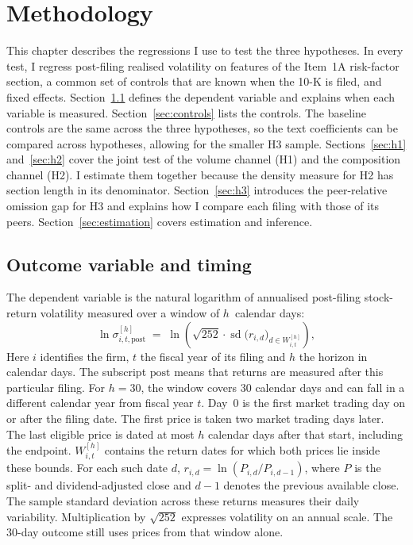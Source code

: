 \chapter{Methodology}
\label{ch:methodology}

This chapter describes the regressions I use to test the three hypotheses.
In every test, I regress post-filing realised volatility on features of the
Item~1A risk-factor section, a common set of controls that are known when the
10-K is filed, and fixed effects.
Section~\ref{sec:outcome} defines the dependent variable and explains when
each variable is measured. Section~\ref{sec:controls} lists the controls. The baseline controls
are the same across the three hypotheses, so the text coefficients can be compared across hypotheses, allowing for the smaller H3 sample. Sections~\ref{sec:h1} and~\ref{sec:h2} cover the joint
test of the volume channel (H1) and the composition channel (H2). I estimate
them together because the density measure for H2 has section length in its
denominator. Section~\ref{sec:h3} introduces the peer-relative omission gap
for H3 and explains how I compare each filing with those of its peers. Section~\ref{sec:estimation}
covers estimation and inference.


\section{Outcome variable and timing}
\label{sec:outcome}

The dependent variable is the natural logarithm of annualised post-filing
stock-return volatility measured over a window of $h$~calendar days:
\begin{equation}
\ln \sigma_{i,t,\mathrm{post}}^{[h]} \;=\; \ln\!\left(
\sqrt{252}\cdot
\operatorname{sd}\!\bigl(r_{i,d}\bigr)_{d \in W_{i,t}^{[h]}}
\right),
\label{eq:vol}
\end{equation}
Here $i$ identifies the firm, $t$ the fiscal year of its filing and $h$ the horizon in calendar days. The subscript $\mathrm{post}$ means that returns are measured after this particular filing. For $h=30$, the window covers 30 calendar days and can fall in a different calendar year from fiscal year $t$. Day~0 is the first market trading day on or after the filing date. The first price is taken two market trading days later. The last eligible price is dated at most $h$ calendar days after that start, including the endpoint. $W_{i,t}^{[h]}$ contains the return dates for which both prices lie inside these bounds. For each such date $d$, $r_{i,d}=\ln(P_{i,d}/P_{i,d-1})$, where $P$ is the split- and dividend-adjusted close and $d-1$ denotes the previous available close. The sample standard deviation across these returns measures their daily variability. Multiplication by $\sqrt{252}$ expresses volatility on an annual scale. The 30-day outcome still uses prices from that window alone.

